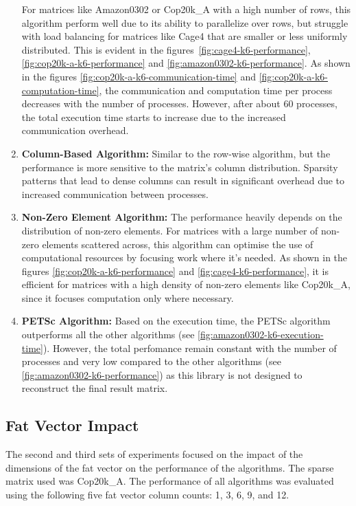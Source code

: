 \documentclass[12pt,oneside]{book} %
\begin{document}
\begin{enumerate}
          For matrices like Amazon0302 or Cop20k\_A with a high number of rows, this
          algorithm perform well due to its ability to parallelize over rows, but
          struggle with load balancing for matrices like Cage4 that are smaller or less
          uniformly distributed. This is evident in the
          figures~\ref{fig:cage4-k6-performance}, \ref{fig:cop20k-a-k6-performance} and
          \ref{fig:amazon0302-k6-performance}. As shown in the figures
          \ref{fig:cop20k-a-k6-communication-time} and
          \ref{fig:cop20k-a-k6-computation-time}, the communication and computation time
          per process decreases with the number of processes. However, after about 60
          processes, the total execution time starts to increase due to the increased
          communication overhead.
    \item \textbf{Column-Based Algorithm:}
          Similar to the row-wise algorithm, but the performance is more
          sensitive to the matrix's column distribution.
          Sparsity patterns that lead to dense columns can result in significant
          overhead due to increased communication between processes.
    \item \textbf{Non-Zero Element Algorithm:}
          The performance heavily depends on the distribution of non-zero elements.
          For matrices with a large number of non-zero elements scattered across,
          this algorithm can optimise the use of computational
          resources by focusing work where it's needed. As shown in the figures {\ref{fig:cop20k-a-k6-performance} and \ref{fig:cage4-k6-performance}}, it is efficient for matrices with a high density of non-zero elements like Cop20k\_A, since it focuses computation only where necessary.
    \item \textbf{PETSc Algorithm:}
          Based on the execution time, the PETSc algorithm outperforms all the other algorithms (see \ref{fig:amazon0302-k6-execution-time}). However, the total perfomance remain constant with the number of processes and very low compared to the other algorithms (see \ref{fig:amazon0302-k6-performance}) as this library is not designed to reconstruct the final result matrix.
\end{enumerate}

\newpage
\subsection{Fat Vector Impact}
The second and third sets of experiments focused on the impact of the
dimensions of the fat vector on the performance of the algorithms. The sparse
matrix used was Cop20k\_A. The performance of all algorithms was evaluated
using the following five fat vector column counts: 1, 3, 6, 9, and 12.
\end{document}
